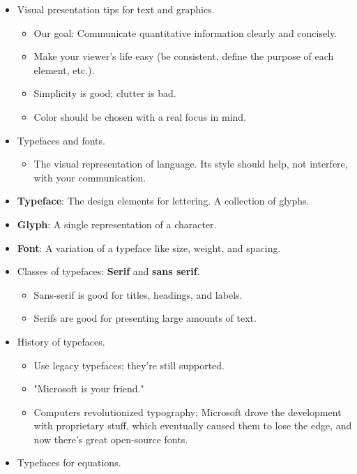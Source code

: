 \documentclass[../notes.tex]{subfiles}
\begin{document}
\begin{itemize}
\begin{enumerate}
\begin{itemize}
        \end{itemize}
    \end{enumerate}
    \item Visual presentation tips for text and graphics.
    \begin{itemize}
        \item Our goal: Communicate quantitative information clearly and concisely.
        \item Make your viewer's life easy (be consistent, define the purpose of each element, etc.).
        \item Simplicity is good; clutter is bad.
        \item Color should be chosen with a real focus in mind.
    \end{itemize}
    \item Typefaces and fonts.
    \begin{itemize}
        \item The visual representation of language. Its style should help, not interfere, with your communication.
    \end{itemize}
    \item \textbf{Typeface}: The design elements for lettering. A collection of glyphs.
    \item \textbf{Glyph}: A single representation of a character.
    \item \textbf{Font}: A variation of a typeface like size, weight, and spacing.
    \item Classes of typefaces: \textbf{Serif} and \textbf{sans serif}.
    \begin{itemize}
        \item Sans-serif is good for titles, headings, and labels.
        \item Serifs are good for presenting large amounts of text.
    \end{itemize}
    \item History of typefaces.
    \begin{itemize}
        \item Use legacy typefaces; they're still supported.
        \item "Microsoft is your friend."
        \item Computers revolutionized typography; Microsoft drove the development with proprietary stuff, which eventually caused them to lose the edge, and now there's great open-source fonts.
    \end{itemize}
    \item Typefaces for equations.

\end{itemize}
\end{document}
